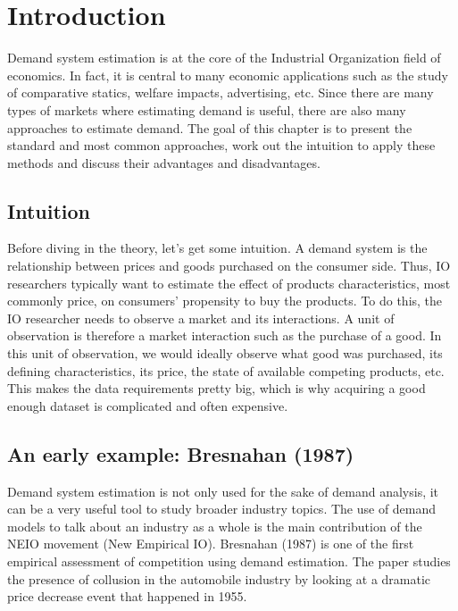 \section{Introduction}

Demand system estimation is at the core of the Industrial Organization field of economics. In fact, it is central to many economic applications such as the study of comparative statics, welfare impacts, advertising, etc. Since there are many types of markets where estimating demand is useful, there are also many approaches to estimate demand. The goal of this chapter is to present the standard and most common approaches, work out the intuition to apply these methods and discuss their advantages and disadvantages.

\subsection{Intuition}

Before diving in the theory, let's get some intuition. A demand system is the relationship between prices and goods purchased on the consumer side. Thus, IO researchers typically want to estimate the effect of products characteristics, most commonly price, on consumers' propensity to buy the products. To do this, the IO researcher needs to observe a market and its interactions. A unit of observation is therefore a market interaction such as the purchase of a good. In this unit of observation, we would ideally observe what good was purchased, its defining characteristics, its price, the state of available competing products, etc. This makes the data requirements pretty big, which is why acquiring a good enough dataset is complicated and often expensive.

\subsection{An early example: Bresnahan (1987)}

Demand system estimation is not only used for the sake of demand analysis, it can be a very useful tool to study broader industry topics. The use of demand models to talk about an industry as a whole is the main contribution of the NEIO movement (New Empirical IO). Bresnahan (1987) is one of the first empirical assessment of competition using demand estimation. The paper studies the presence of collusion in the automobile industry by looking at a dramatic price decrease event that happened in 1955.

